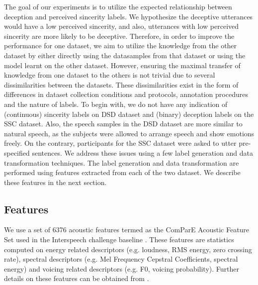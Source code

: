 \documentclass{article}
\begin{document}
The goal of our experiments is to utilize the expected relationship between deception and perceived sincerity labels.
We hypothesize the deceptive utterances would have a low perceived sincerity, and also, utterances with low perceived sincerity are more likely to be deceptive.
Therefore, in order to improve the performance for one dataset, we aim to utilize the knowledge from the other dataset by either directly using the datasamples from that dataset or using the model learnt on the other dataset.
However, ensuring the maximal transfer of knowledge from one dataset to the others is not trivial due to several dissimilarities between the datasets.
These dissimilarities exist in the form of differences in dataset collection conditions and protocols, annotation procedures and the nature of labels.
To begin with, we do not have any indication of (continuous) sincerity labels on DSD dataset and (binary) deception labels on the SSC dataset.
Also, the speech samples in the DSD dataset are more similar to natural speech, as the subjects were allowed to arrange speech and show emotions freely. 
On the contrary, participants for the SSC dataset were asked to utter pre-specified sentences. 
We address these issues using a few label generation and data transformation techniques.
The label generation and data transformation are performed using features extracted from each of the two dataset.
We describe these features in the next section.

\subsection{Features}
\label{sec:feats} 
We use a set of 6376 acoustic features termed as the ComParE Acoustic Feature Set used in the Interspeech challenge baseline \cite{schuller2015interspeech,schuller2016interspeech}.
These features are statistics computed on energy related descriptors (e.g. loudness, RMS energy, zero crossing rate), spectral descriptors (e.g. Mel Frequency Cepstral Coefficients, spectral energy) and voicing related descriptors (e.g. F0, voicing probability).
Further details on these features can be obtained from \cite{weninger2013acoustics}. 
\end{document}
